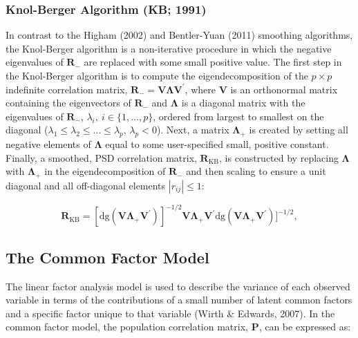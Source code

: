 \documentclass[
  english,
  man]{apa6}
\begin{document}
\hypertarget{knol-berger-algorithm-kb-1991}{%
\subsubsection{Knol-Berger Algorithm (KB; 1991)}\label{knol-berger-algorithm-kb-1991}}

In contrast to the Higham (2002) and Bentler-Yuan (2011) smoothing algorithms, the Knol-Berger algorithm is a non-iterative procedure in which the negative eigenvalues of \(\mathbf{R}_{-}\) are replaced with some small positive value. The first step in the Knol-Berger algorithm is to compute the eigendecomposition of the \(p \times p\) indefinite correlation matrix, \(\mathbf{R}_{-}= \mathbf{V \Lambda V}^\prime\), where \(\mathbf{V}\) is an orthonormal matrix containing the eigenvectors of \(\mathbf{R}_{-}\) and \(\mathbf{\Lambda}\) is a diagonal matrix with the eigenvalues of \(\mathbf{R}_{-}\), \(\lambda_i, \: i \in \{1, \dots, p \}\), ordered from largest to smallest on the diagonal (\(\lambda_1 \leq \lambda_2 \leq \dots \leq \lambda_p\), \(\lambda_p < 0\)). Next, a matrix \(\mathbf{\Lambda_+}\) is created by setting all negative elements of \(\mathbf{\Lambda}\) equal to some user-specified small, positive constant. Finally, a smoothed, PSD correlation matrix, \(\mathbf{R}_{\textrm{KB}}\), is constructed by replacing \(\mathbf{\Lambda}\) with \(\mathbf{\Lambda_+}\) in the eigendecomposition of \(\mathbf{R}_{-}\) and then scaling to ensure a unit diagonal and all off-diagonal elements \(|r_{ij}| \leq 1\):

\begin{equation}
\mathbf{R}_{\textrm{KB}}= [\textrm{dg}(\mathbf{V \Lambda_+ V}^\prime)]^{-1/2} \mathbf{V \Lambda_+ V}^\prime \textrm{dg}(\mathbf{V \Lambda_+ V}^\prime)]^{-1/2},
\label{eq:Rkb}
\end{equation}

\hypertarget{the-common-factor-model}{%
\subsection{The Common Factor Model}\label{the-common-factor-model}}

The linear factor analysis model is used to describe the variance of each observed variable in terms of the contributions of a small number of latent common factors and a specific factor unique to that variable (Wirth \& Edwards, 2007). In the common factor model, the population correlation matrix, \(\mathbf{P}\), can be expressed as:
\end{document}
